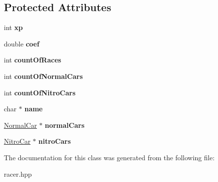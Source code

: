 \subsection*{Protected Attributes}
\begin{DoxyCompactItemize}
\item 
int {\bfseries xp}\hypertarget{classRacer_adbce117b3d742cc41e01d20b1752ad94}{}\label{classRacer_adbce117b3d742cc41e01d20b1752ad94}

\item 
double {\bfseries coef}\hypertarget{classRacer_a9fd780b6ab4a8a8075824f6baa2bd307}{}\label{classRacer_a9fd780b6ab4a8a8075824f6baa2bd307}

\item 
int {\bfseries count\+Of\+Races}\hypertarget{classRacer_a6be61d6150eeffc13051f260f6420f7d}{}\label{classRacer_a6be61d6150eeffc13051f260f6420f7d}

\item 
int {\bfseries count\+Of\+Normal\+Cars}\hypertarget{classRacer_a4e7cf66fc4c087ac51fca358d0e733cb}{}\label{classRacer_a4e7cf66fc4c087ac51fca358d0e733cb}

\item 
int {\bfseries count\+Of\+Nitro\+Cars}\hypertarget{classRacer_afd236447a3d77d0d3a92c689c944b88d}{}\label{classRacer_afd236447a3d77d0d3a92c689c944b88d}

\item 
char $\ast$ {\bfseries name}\hypertarget{classRacer_aa8aeb11da5a6f64e898a2825beab567f}{}\label{classRacer_aa8aeb11da5a6f64e898a2825beab567f}

\item 
\hyperlink{classNormalCar}{Normal\+Car} $\ast$ {\bfseries normal\+Cars}\hypertarget{classRacer_ace5b707314229abeafd48de3e56a4a79}{}\label{classRacer_ace5b707314229abeafd48de3e56a4a79}

\item 
\hyperlink{classNitroCar}{Nitro\+Car} $\ast$ {\bfseries nitro\+Cars}\hypertarget{classRacer_a2e943b7f04fb6c8a7ebbcadfd388d60a}{}\label{classRacer_a2e943b7f04fb6c8a7ebbcadfd388d60a}

\end{DoxyCompactItemize}


The documentation for this class was generated from the following file\+:\begin{DoxyCompactItemize}
\item 
racer.\+hpp\end{DoxyCompactItemize}
